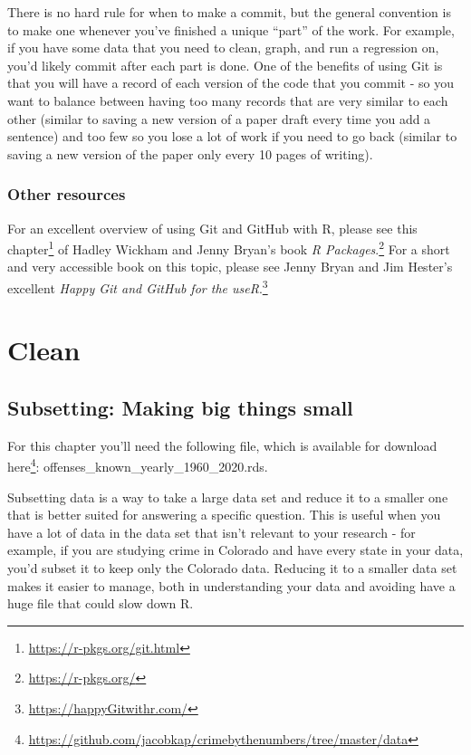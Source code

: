 \documentclass[
]{krantz}
\renewcommand{\href}[2]{#2\footnote{\url{#1}}}
\begin{document}
There is no hard rule for when to make a commit, but the
general convention is to make one whenever you've finished a
unique ``part'' of the work. For example, if you have some
data that you need to clean, graph, and run a regression on,
you'd likely commit after each part is done. One of the
benefits of using Git is that you will have a record of each
version of the code that you commit - so you want to balance
between having too many records that are very similar to
each other (similar to saving a new version of a paper draft
every time you add a sentence) and too few so you lose a lot
of work if you need to go back (similar to saving a new
version of the paper only every 10 pages of writing).

\hypertarget{other-resources}{%
\section{Other resources}\label{other-resources}}

For an excellent overview of using Git and GitHub with R,
please see \href{https://r-pkgs.org/git.html}{this chapter}
of Hadley Wickham and Jenny Bryan's book
\href{https://r-pkgs.org/}{\emph{R Packages}.} For a short
and very accessible book on this topic, please see Jenny
Bryan and Jim Hester's excellent
\href{https://happyGitwithr.com/}{\emph{Happy Git and GitHub
for the useR}.}

\hypertarget{part-clean}{%
\part{Clean}\label{part-clean}}

\hypertarget{subsetting-intro}{%
\chapter{Subsetting: Making big things
small}\label{subsetting-intro}}

For this chapter you'll need the following file, which is
available for download
\href{https://github.com/jacobkap/crimebythenumbers/tree/master/data}{here}:
offenses\_known\_yearly\_1960\_2020.rds.

Subsetting data is a way to take a large data set and reduce
it to a smaller one that is better suited for answering a
specific question. This is useful when you have a lot of
data in the data set that isn't relevant to your research -
for example, if you are studying crime in Colorado and have
every state in your data, you'd subset it to keep only the
Colorado data. Reducing it to a smaller data set makes it
easier to manage, both in understanding your data and
avoiding have a huge file that could slow down R.
\end{document}
